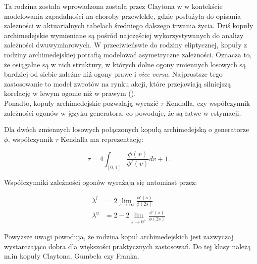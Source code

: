 Ta rodzina została wprowadzona została przez Claytona w \cite{Clayton1972} w kontekście modelowania zapadalności na choroby przewlekłe, gdzie posłużyła do opisania zależności w aktuarialnych tabelach średniego dalszego trwania życia. Dziś kopuły archimedejskie wymieniane są pośród najczęściej wykorzystywanych do analizy zależności dwuwymiarowych. W przeciwieńswie do rodziny eliptycznej, kopuły z rodziny archimedejskiej potrafią modelować asymetryczne zależności. Oznacza to, że osiągalne są w nich struktury, w których dolne ogony zmiennych losowych są bardziej od siebie zależne niż ogony prawe i \emph{vice versa}. Najprostsze tego zastosowanie to model zwrotów na rynku akcji, które przejawiają silniejszą korelację w lewym ogonie niż w prawym (\cite{AssymetricEquityDependency}). \\
Ponadto, kopuły archimedejskie pozwalają wyrazić $\tau$ Kendalla, czy współczynnik zależności ogonów w języku generatora, co powoduje, że są łatwe w estymacji.

\begin{prop}
	Dla dwóch zmiennych losowych połączonych kopułą archimedejską o generatorze $\phi$, współczynnik $\tau$ Kendalla ma reprezentację:
	
	$$ \tau = 4\int_{[0, 1]}\frac{\phi(v)}{\phi'(v)}dv + 1.$$
	
	Współczynniki zależności ogonów wyrażają się natomiast przez:
	
	\begin{equation}
		\begin{split}
		\lambda^{l}&=2\lim\limits_{s\to\infty}\frac{\phi'(s)}{\phi(2s)} \\
		\lambda^{u}&=2-2\lim\limits_{s\to0^{+}}\frac{\phi'(s)}{\phi(2s)}
		\end{split}
	\end{equation}
\end{prop}
Powyższe uwagi powoduja, że rodzina kopuł archimedejskich jest zazwyczaj wystarczająco dobra dla większości praktycznych zastosowań. Do tej klasy należą m.in kopuły Claytona, Gumbela czy Franka.

